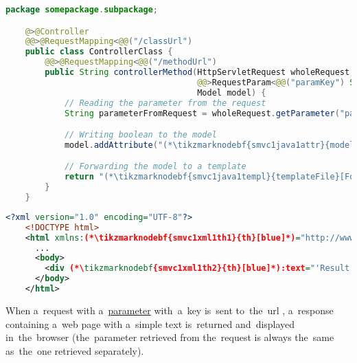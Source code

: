 \begin{lstlisting}[language=Java, title={Controller class}]
    package somepackage.subpackage;

    @>@Controller
    @@>@RequestMapping<@@("/classUrl")
    public class ControllerClass {
        @@>@RequestMapping<@@("/methodUrl")
        public String controllerMethod(HttpServletRequest wholeRequest,
                                       @@>RequestParam<@@("paramKey") String singleParameter,
                                       Model model) {
            // Reading the parameter from the request
            String parameterFromRequest = wholeRequest.getParameter("paramKey");

            // Writing boolean to the model
            model.addAttribute("(*\tikzmarknodebf{smvc1java1attr}{modelAttribute}[ForestGreen]*)", parameterFromRequest.equals(singleParameter));

            // Forwarding the model to a template
            return "(*\tikzmarknodebf{smvc1java1templ}{templateFile}[ForestGreen]*)";
        }
    }
\end{lstlisting}
\begin{lstlisting}[language=XML, title={Thymeleaf template file called \tikzmarknodebf{smvc1xml1templ}{\textit{templateFile}}\textit{.html}}]
    <?xml version="1.0" encoding="UTF-8"?>
    <!DOCTYPE html>
    <html xmlns:(*\tikzmarknodebf{smvc1xml1th1}{th}[blue]*)="http://www.thymeleaf.org">
      ...
      <body>
        <div (*\tikzmarknodebf{smvc1xml1th2}{th}[blue]*):text="'Result: ' + (*\textcolor{ForestGreen}{\$\{}\tikzmarknodebf{smvc1xml1attr}{modelAttribute}[ForestGreen]\textcolor{ForestGreen}{\}}*)"></div>
      </body>
    </html>
\end{lstlisting}

\noindent When a~request with a~\hyperref[jspattributeparameter]{parameter} with~a~key  is~sent to~the~url , a~response containing a~web page with a~simple text  is~returned and~displayed in~the~browser (the~parameter retrieved from the~request is always the~same as~the~one retrieved separately).

